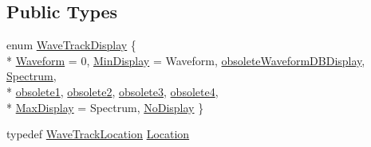 \subsection*{Public Types}
\begin{DoxyCompactItemize}
\item 
enum \hyperlink{class_wave_track_a084eba52413a5cc74d2634b36e2f85b5}{Wave\+Track\+Display} \{ \\*
\hyperlink{class_wave_track_a084eba52413a5cc74d2634b36e2f85b5aeef9a24216b729762bfd38161b5b2a83}{Waveform} = 0, 
\hyperlink{class_wave_track_a084eba52413a5cc74d2634b36e2f85b5a28366f7f02378aa2d22f68aa9749cc77}{Min\+Display} = Waveform, 
\hyperlink{class_wave_track_a084eba52413a5cc74d2634b36e2f85b5af78a59d2fbae6820d78fa0432da86fa9}{obsolete\+Waveform\+D\+B\+Display}, 
\hyperlink{class_wave_track_a084eba52413a5cc74d2634b36e2f85b5ac0941a4c239c9e4a1d487f31786fbbc9}{Spectrum}, 
\\*
\hyperlink{class_wave_track_a084eba52413a5cc74d2634b36e2f85b5ae399eda417597cc247dc53089c3ae206}{obsolete1}, 
\hyperlink{class_wave_track_a084eba52413a5cc74d2634b36e2f85b5a2861fcbe6b2c873bc1c4d10934edcd38}{obsolete2}, 
\hyperlink{class_wave_track_a084eba52413a5cc74d2634b36e2f85b5a6d6f7469ba9d186c38170579d4413038}{obsolete3}, 
\hyperlink{class_wave_track_a084eba52413a5cc74d2634b36e2f85b5a446c719ff6418942022165eda0a89bde}{obsolete4}, 
\\*
\hyperlink{class_wave_track_a084eba52413a5cc74d2634b36e2f85b5ac03e32af666d2db7c4506d1e8ccb5fe6}{Max\+Display} = Spectrum, 
\hyperlink{class_wave_track_a084eba52413a5cc74d2634b36e2f85b5aec4136d58eed6538deee71dd3bf5c2d7}{No\+Display}
 \}
\item 
typedef \hyperlink{struct_wave_track_location}{Wave\+Track\+Location} \hyperlink{class_wave_track_a7982000384163865535670612b611529}{Location}
\end{DoxyCompactItemize}
